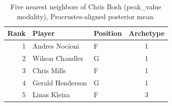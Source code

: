 \begin{table}[htbp]
  \centering\small
  \begin{tabular}{rllc}
    \toprule
    Rank & Player & Position & Archetype \\
    \midrule
    1 & Andres Nocioni & F & 1 \\
    2 & Wilson Chandler & G & 1 \\
    3 & Chris Mills & F & 1 \\
    4 & Gerald Henderson & G & 1 \\
    5 & Linas Kleiza & F & 3 \\
    \bottomrule
  \end{tabular}
  \caption{Five nearest neighbors of Chris Bosh (peak_value modality), Procrustes-aligned posterior mean.}
  \label{tab:Chris_Bosh_neighbors_peak_value}
\end{table}

